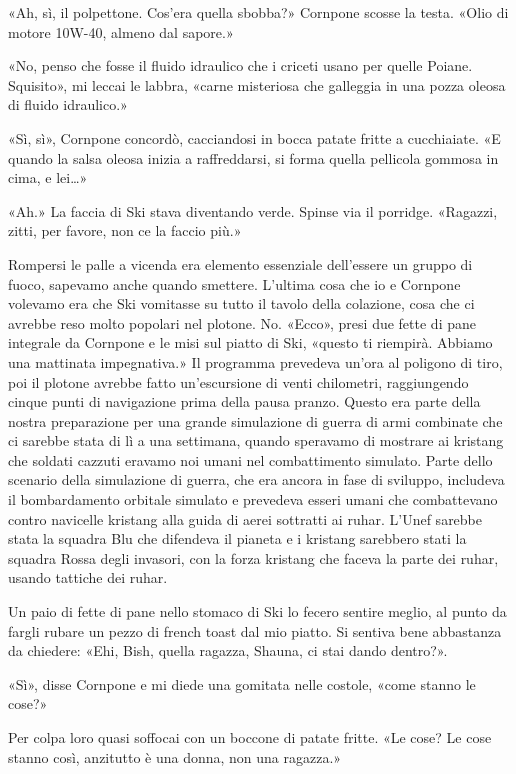 «Ah, sì, il polpettone. Cos'era quella sbobba?» Cornpone scosse la
testa. «Olio di motore 10W-40, almeno dal sapore.»

«No, penso che fosse il fluido idraulico che i criceti usano per quelle
Poiane. Squisito», mi leccai le labbra, «carne misteriosa che galleggia
in una pozza oleosa di fluido idraulico.»

«Sì, sì», Cornpone concordò, cacciandosi in bocca patate fritte a
cucchiaiate. «E quando la salsa oleosa inizia a raffreddarsi, si forma
quella pellicola gommosa in cima, e lei\ldots»

«Ah.» La faccia di Ski stava diventando verde. Spinse via il porridge.
«Ragazzi, zitti, per favore, non ce la faccio più.»

Rompersi le palle a vicenda era elemento essenziale dell'essere un
gruppo di fuoco, sapevamo anche quando smettere. L'ultima cosa che io e
Cornpone volevamo era che Ski vomitasse su tutto il tavolo della
colazione, cosa che ci avrebbe reso molto popolari nel plotone. No.
«Ecco», presi due fette di pane integrale da Cornpone e le misi sul
piatto di Ski, «questo ti riempirà. Abbiamo una mattinata impegnativa.»
Il programma prevedeva un'ora al poligono di tiro, poi il plotone
avrebbe fatto un'escursione di venti chilometri, raggiungendo cinque
punti di navigazione prima della pausa pranzo. Questo era parte della
nostra preparazione per una grande simulazione di guerra di armi
combinate che ci sarebbe stata di lì a una settimana, quando speravamo
di mostrare ai kristang che soldati cazzuti eravamo noi umani nel
combattimento simulato. Parte dello scenario della simulazione di
guerra, che era ancora in fase di sviluppo, includeva il bombardamento
orbitale simulato e prevedeva esseri umani che combattevano contro
navicelle kristang alla guida di aerei sottratti ai ruhar. L'Unef
sarebbe stata la squadra Blu che difendeva il pianeta e i kristang
sarebbero stati la squadra Rossa degli invasori, con la forza kristang
che faceva la parte dei ruhar, usando tattiche dei ruhar.

Un paio di fette di pane nello stomaco di Ski lo fecero sentire meglio,
al punto da fargli rubare un pezzo di french toast dal mio piatto. Si
sentiva bene abbastanza da chiedere: «Ehi, Bish, quella ragazza, Shauna,
ci stai dando dentro?».

«Sì», disse Cornpone e mi diede una gomitata nelle costole, «come stanno
le cose?»

Per colpa loro quasi soffocai con un boccone di patate fritte. «Le cose?
Le cose stanno così, anzitutto è una donna, non una ragazza.»


